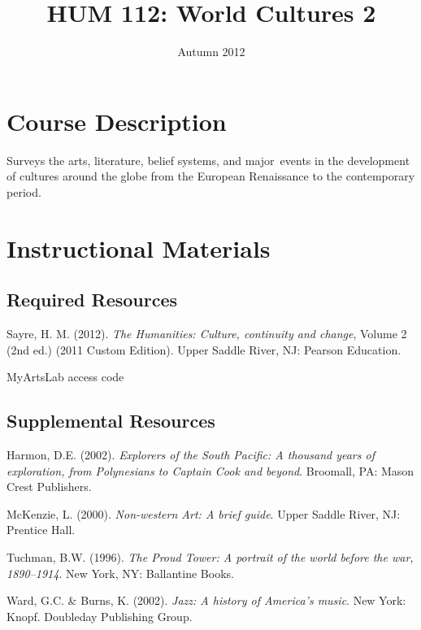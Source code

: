 \documentclass{article}
\title{HUM 112: World Cultures 2}
\date{Autumn 2012}
\begin{document}
\maketitle


\section*{Course Description}
Surveys the arts, literature, belief systems, and major events in the development of cultures around the globe from the European Renaissance to the contemporary period.

\section*{Instructional Materials}
\subsection*{Required Resources}
\begin{itemize*}
	\item Sayre, H. M. (2012). \emph{The Humanities: Culture, continuity and change}, Volume 2 (2nd ed.) (2011 Custom Edition). Upper Saddle River, NJ: Pearson Education.
	\item MyArtsLab access code
\end{itemize*}

\subsection*{Supplemental Resources}
\begin{itemize*}
	\item Harmon, D.E. (2002). \emph{Explorers of the South Pacific: A thousand years of exploration, from Polynesians to Captain Cook and beyond}. Broomall, PA: Mason Crest Publishers.
	\item McKenzie, L. (2000). \emph{Non-western Art: A brief guide}. Upper Saddle River, NJ: Prentice Hall.
	\item Tuchman, B.W. (1996). \emph{The Proud Tower: A portrait of the world before the war, 1890--1914}. New York, NY: Ballantine Books.
	\item Ward, G.C. \& Burns, K. (2002). \emph{Jazz: A history of America's music}. New York: Knopf. Doubleday Publishing Group.
\end{itemize*}
\end{document}
